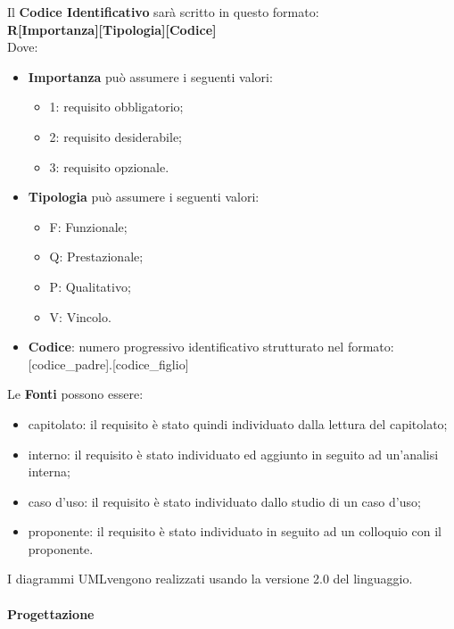 Il \textbf{Codice Identificativo} sarà scritto in questo formato: \\
\textbf{R[Importanza][Tipologia][Codice]} \\
Dove:
\begin{itemize}
	\item \textbf{Importanza} può assumere i seguenti valori:
	\begin{itemize}
		\item 1: requisito obbligatorio;
		\item 2: requisito desiderabile;
		\item 3: requisito opzionale.
	\end{itemize}
	\item \textbf{Tipologia} può assumere i seguenti valori:
	\begin{itemize}
		\item F: Funzionale;
		\item Q: Prestazionale;
		\item P: Qualitativo;
		\item V: Vincolo.
	\end{itemize}
	\item\textbf{Codice}: numero progressivo identificativo strutturato nel formato: [codice\_padre].[codice\_figlio]
\end{itemize}
Le \textbf{Fonti} possono essere:
\begin{itemize}
	\item capitolato\glo: il requisito è stato quindi individuato dalla lettura del capitolato\glo;
	\item interno: il requisito è stato individuato ed aggiunto in seguito ad un'analisi interna;
	\item caso d'uso: il requisito è stato individuato dallo studio di un caso d'uso;
	\item proponente: il requisito è stato individuato in seguito ad un colloquio con il proponente.
\end{itemize}
I diagrammi UML\glosp vengono realizzati usando la versione 2.0 del linguaggio.\pagebreak
\paragraph{Progettazione}
